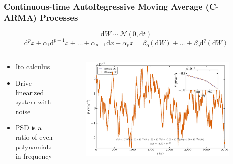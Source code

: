 \documentclass[hyperref={pdfpagelabels=false}]{beamer}
\begin{document}
\begin{frame}
\frametitle{Continuous-time AutoRegressive Moving Average (C-ARMA) Processes}
  \begin{equation*} \mathrm{d}W \sim \mathcal{N}(0,\mathrm{d}t) \end{equation*}
  \begin{equation*}\label{eq:CARMA} \mathrm{d}^{p}x + \alpha_{1} \mathrm{d}^{p-1}x + \ldots + \alpha_{p-1} \mathrm{d}x + \alpha_{p}x = \beta_{0} (\mathrm{d}W) + \ldots + \beta_{q} \mathrm{d}^{q}(\mathrm{d}W) \end{equation*}
  \begin{columns}
    \centering
    \begin{column}{0.5\textwidth}
      \begin{itemize}
        \item It\={o} calculus {\tiny \citet{Brockwell14,Davis,Kelly14}}
        \item Drive linearized system with noise
        \item PSD is a ratio of even polynomials in frequency
      \end{itemize}
    \end{column}
    \begin{column}{0.5\textwidth}
      \begin{figure}
        \includegraphics[scale=0.0425]{images/CARMA(3,1)_LC.jpg}
      \end{figure}
    \end{column}
  \end{columns}
\end{frame}
\end{document}
